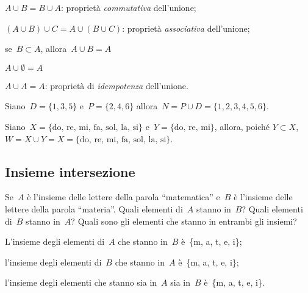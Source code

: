 \begin{enumeratea}
\item \(A\cup B=B\cup A\): proprietà \emph{commutativa} dell'unione;
\item \((A\cup B)\cup C=A\cup (B\cup C)\): proprietà \emph{associativa} 
dell'unione;
\item se~\(B\subset A\), allora~\(A\cup B=A\)
\item \(A\cup \emptyset =A\)
\item \(A\cup A=A\): proprietà di \emph{idempotenza} dell'unione.
\end{enumeratea}

 \begin{esempio}
Siano~\(D=\{1,3,5\}\) e~\(P=\{2,4,6\}\) 
allora~\(N=P\cup D=\{1,2,3,4,5,6\}\).
\begin{center}
 
\end{center}

\end{esempio}

\begin{esempio}
Siano~\(X=\{\text{do, re, mi, fa, sol, la, si}\}\)
e~\(Y=\{\text{do, re, mi}\}\), allora, 
poiché 
\(Y\subset X\), \(W=X\cup Y=X=\{\text{do, re, mi, fa, sol, la, si}\}\).
\begin{center}
 
\end{center}

\end{esempio}


\subsection{Insieme intersezione}
\label{subsec:op_intersezione}

\vspace{1.05ex}
 \begin{esempio}
Se~\(A\) è l'insieme delle lettere della parola ``matematica'' e~\(B\) è 
l'insieme delle lettere della parola ``materia''. 
Quali elementi di~\(A\) stanno in~\(B\)? Quali elementi di~\(B\) stanno 
in~\(A\)? 
Quali sono gli elementi che stanno in entrambi gli insiemi?

\begin{itemize*}
 \item L'insieme degli elementi di~\(A\) che stanno in~\(B\) 
 è~\{m, a, t, e, i\};
 \item l'insieme degli elementi di~\(B\) che stanno in~\(A\) 
 è~\{m, a, t, e, i\};
 \item l'insieme degli elementi che stanno sia in~\(A\) sia in~\(B\) 
 è~\{m, a, t, e, i\}.
\end{itemize*}
\end{esempio}

